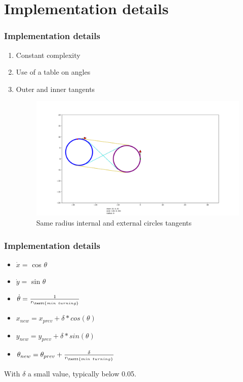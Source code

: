 \documentclass{beamer}
\begin{document}
\section{Implementation details}

\begin{frame}


\frametitle{Implementation details}

\begin{enumerate}
	\pause
	\item Constant complexity
	\pause
	\item Use of a table on angles
	\pause
	\item Outer and inner tangents
	\begin{figure}
	\centering
		\centering
		\includegraphics[width=\linewidth]{Illustrations/001tangents.png}
		\caption{Same radius internal and external circles tangents}%
		\label{fig:sub1}
	\end{figure}
\end{enumerate}

\end{frame}

\begin{frame}


\frametitle{Implementation details}

\begin{itemize}
	\item $\dot{x} =$ cos $\theta$
	\item $\dot{y} =$ sin $\theta$
	\item $\dot{\theta} = \frac{1}{r_{\textt{min\ turning}}}$
\end{itemize}

\begin{itemize}
	\item $x_{new} = x_{prev} + \delta * cos(\theta)$
	\item $y_{new} = y_{prev} + \delta * sin(\theta)$
	\item $\theta_{new} = \theta_{prev} + \frac{\delta}{r_{\textt{min\ turning}}}$
\end{itemize}

With $\delta$ a small value, typically below 0.05.

\end{frame}
\end{document}
